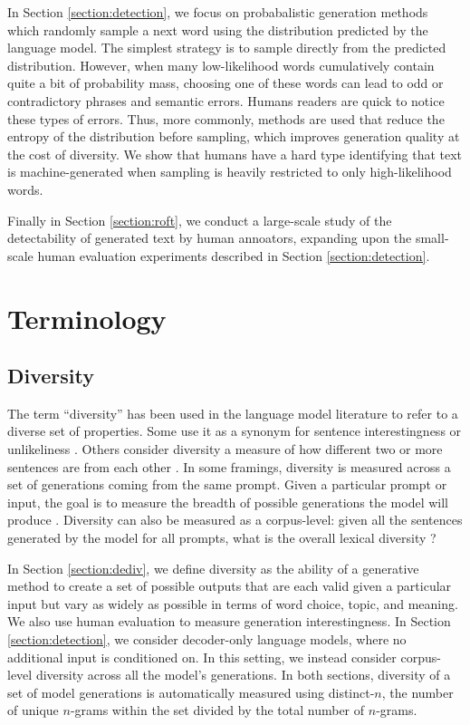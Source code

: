 In Section \ref{section:detection}, we focus on probabalistic generation methods which randomly sample a next word using the distribution predicted by the language model.
The simplest strategy is to sample directly from the predicted distribution.
However, when many low-likelihood words cumulatively contain quite a bit of probability mass, choosing one of these words can lead to odd or contradictory phrases and semantic errors.
Humans readers are quick to notice these types of errors.
Thus, more commonly, methods are used that reduce the entropy of the distribution before sampling, which improves generation quality at the cost of diversity.
We show that humans have a hard type identifying that text is machine-generated when sampling is heavily restricted to only high-likelihood words.

Finally in Section \ref{section:roft}, we conduct a large-scale study of the detectability of generated text by human annoators, expanding upon the small-scale human evaluation experiments described in Section \ref{section:detection}.

\section{Terminology}
\subsection{Diversity}
The term ``diversity'' has been used in the language model literature to refer to a diverse set of properties.
Some use it as a synonym for sentence interestingness or unlikeliness \citep{tatsunori2019unifying}.
Others consider diversity a measure of how different two or more sentences are from each other \citep{vijayakumar2016diverse,gimpel2013systematic}.
In some framings, diversity is measured across a set of generations coming from the same prompt.
Given a particular prompt or input, the goal is to measure the breadth of possible generations the model will produce \citep{mayhew2020simultaneous}.
Diversity can also be measured as a corpus-level: given all the sentences generated by the model for all prompts, what is the overall lexical diversity ?

In Section \ref{section:dediv}, we define diversity as the ability of a generative method to create a set of possible outputs that are each valid given a particular input but vary as widely as possible in terms of word choice, topic, and meaning.
We also use human evaluation to measure generation interestingness.
In Section \ref{section:detection}, we consider decoder-only language models, where no additional input is conditioned on.
In this setting, we instead consider corpus-level diversity across all the model's generations.
In both sections, diversity of a set of model generations is automatically measured using distinct-$n$, the number of unique $n$-grams within the set divided by the total number of $n$-grams.


